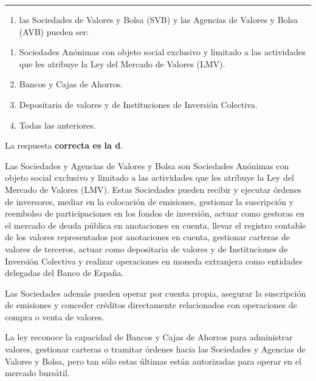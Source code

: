 \documentclass[
  letterpaper,
  DIV=11,
  numbers=noendperiod]{scrreprt}
\providecommand{\tightlist}{%
  \setlength{\itemsep}{0pt}\setlength{\parskip}{0pt}}\usepackage{longtable,booktabs,array}
\begin{document}
\begin{center}\rule{0.5\linewidth}{0.5pt}\end{center}

\begin{enumerate}
\def\labelenumi{\arabic{enumi}.}
\setcounter{enumi}{3}
\tightlist
\item
  las Sociedades de Valores y Bolsa (SVB) y las Agencias de Valores y
  Bolsa (AVB) pueden ser:
\end{enumerate}

\begin{enumerate}
\def\labelenumi{\alph{enumi})}
\item
  Sociedades Anónimas con objeto social exclusivo y limitado a las
  actividades que les atribuye la Ley del Mercado de Valores (LMV).
\item
  Bancos y Cajas de Ahorros.
\item
  Depositaria de valores y de Instituciones de Inversión Colectiva.
\item
  Todas las anteriores.
\end{enumerate}

\begin{tcolorbox}[enhanced jigsaw, left=2mm, opacityback=0, colback=white, breakable, arc=.35mm, bottomrule=.15mm, rightrule=.15mm, toprule=.15mm, leftrule=.75mm, colframe=quarto-callout-tip-color-frame]
\begin{minipage}[t]{5.5mm}
\textcolor{quarto-callout-tip-color}{\faLightbulb}
\end{minipage}%
\begin{minipage}[t]{\textwidth - 5.5mm}

La respuesta \textbf{correcta es la d}.

Las Sociedades y Agencias de Valores y Bolsa son Sociedades Anónimas con
objeto social exclusivo y limitado a las actividades que les atribuye la
Ley del Mercado de Valores (LMV). Estas Sociedades pueden recibir y
ejecutar órdenes de inversores, mediar en la colocación de emisiones,
gestionar la suscripción y reembolso de participaciones en los fondos de
inversión, actuar como gestoras en el mercado de deuda pública en
anotaciones en cuenta, llevar el registro contable de los valores
representados por anotaciones en cuenta, gestionar carteras de valores
de terceros, actuar como depositaria de valores y de Instituciones de
Inversión Colectiva y realizar operaciones en moneda extranjera como
entidades delegadas del Banco de España.

Las Sociedades además pueden operar por cuenta propia, asegurar la
suscripción de emisiones y conceder créditos directamente relacionados
con operaciones de compra o venta de valores.

La ley reconoce la capacidad de Bancos y Cajas de Ahorros para
administrar valores, gestionar carteras o tramitar órdenes hacia las
Sociedades y Agencias de Valores y Bolsa, pero tan sólo estas últimas
están autorizadas para operar en el mercado bursátil.

\end{minipage}%
\end{tcolorbox}
\end{document}
